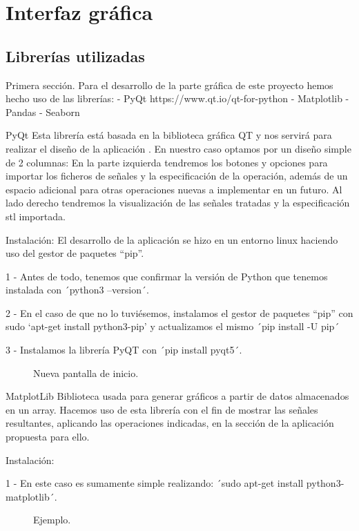 \chapter{Interfaz gráfica}
\label{cha:gui}
 
\section{Librerías utilizadas}
Primera sección.
Para el desarrollo de la parte gráfica de este proyecto hemos hecho uso de las librerías:
- PyQt https://www.qt.io/qt-for-python
- Matplotlib
- Pandas
- Seaborn 
 
PyQt
Esta librería está basada en la biblioteca gráfica QT y nos servirá para realizar el diseño de la aplicación    . En nuestro caso optamos por un diseño simple de 2 columnas: En la parte izquierda tendremos los botones y opciones para importar los ficheros de señales y la especificación de la operación, además de un espacio adicional para otras operaciones nuevas a implementar en un futuro. Al lado derecho tendremos la visualización de las señales tratadas y la especificación stl importada.
 
Instalación: 
El desarrollo de la aplicación se hizo en un entorno linux haciendo uso del gestor de paquetes “pip”. 
 
1 - Antes de todo, tenemos que confirmar la versión de Python que tenemos instalada con ´python3 --version´.
 
2 - En el caso de que no lo tuviésemos, instalamos el gestor de paquetes “pip” con sudo ‘apt-get install python3-pip’ y actualizamos el mismo ´pip install -U pip´ 
 
3 - Instalamos la librería PyQT con ´pip install pyqt5´. 
 
\begin{figure}
\centering
\caption{Nueva pantalla de inicio.}
\label{fig:senal}
\end{figure}
 
MatplotLib
Biblioteca usada para generar gráficos a partir de datos almacenados en un array. Hacemos uso de esta librería con el fin de mostrar las señales resultantes, aplicando las operaciones indicadas, en la sección de la aplicación propuesta para ello. 
 
Instalación: 
 
1 - En este caso es sumamente simple realizando: ´sudo apt-get install python3-matplotlib´.
 
\begin{figure}
\centering
\caption{Ejemplo.}
\label{fig:senal}
\end{figure}
 
